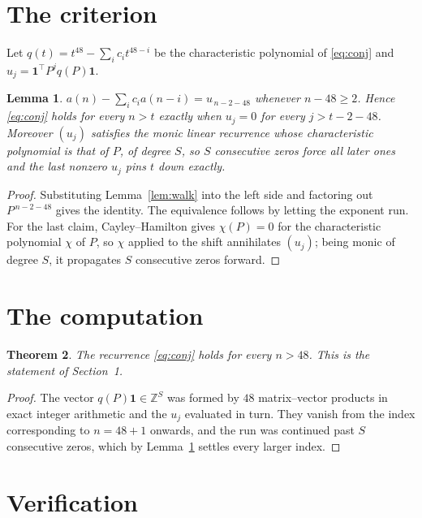 \documentclass[11pt,a4paper]{article}
\theoremstyle{plain}
\newtheorem{theorem}{Theorem}
\newtheorem{lemma}[theorem]{Lemma}
\theoremstyle{definition}
\begin{document}
\section{The criterion}

Let $q(t)=t^{48}-\sum_i c_i t^{48-i}$ be the characteristic polynomial of
\eqref{eq:conj} and $u_j=\mathbf{1}^{\!\top}P^{j}q(P)\mathbf{1}$.

\begin{lemma}\label{lem:crit}
$a(n)-\sum_i c_i a(n-i)=u_{\,n-2-48}$ whenever $n-48\ge2$. Hence
\eqref{eq:conj} holds for every $n>t$ exactly when $u_j=0$ for every
$j>t-2-48$. Moreover $(u_j)$ satisfies the monic linear recurrence whose
characteristic polynomial is that of $P$, of degree $S$, so $S$ consecutive zeros force all
later ones and the last nonzero $u_j$ pins $t$ down exactly.
\end{lemma}

\begin{proof}
Substituting Lemma~\ref{lem:walk} into the left side and factoring out
$P^{\,n-2-48}$ gives the identity. The equivalence follows by letting the exponent
run. For the last claim, Cayley--Hamilton gives $\chi(P)=0$ for the characteristic
polynomial $\chi$ of $P$, so $\chi$ applied to the shift annihilates $(u_j)$; being monic of
degree $S$, it propagates $S$ consecutive zeros forward.
\end{proof}

\section{The computation}

\begin{theorem}
The recurrence \eqref{eq:conj} holds for every $n>48$. This is the statement of
Section~1.
\end{theorem}

\begin{proof}
The vector $q(P)\mathbf{1}\in\mathbb{Z}^{S}$ was formed by $48$ matrix--vector
products in exact integer arithmetic and the $u_j$ evaluated in turn. They vanish from the
index corresponding to $n=48+1$ onwards, and the run was continued past $S$ consecutive
zeros, which by Lemma~\ref{lem:crit} settles every larger index.
\end{proof}

\section{Verification}
\end{document}
